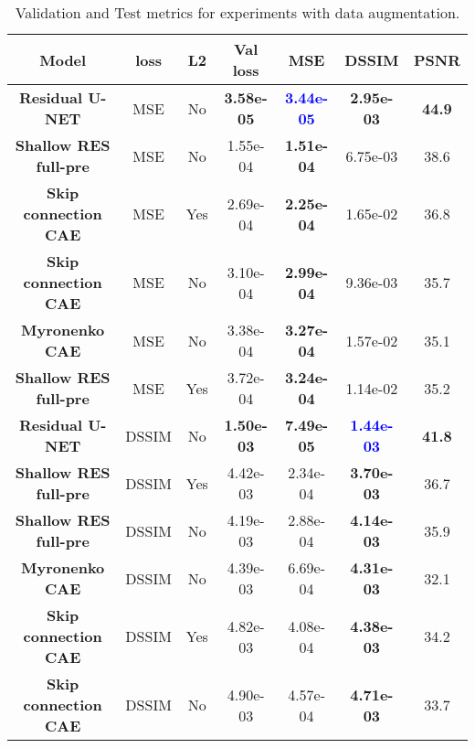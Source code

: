 \begin{table}[!ht]
  \begin{center}
   \setlength\extrarowheight{2pt} %
   \begin{tabular}{>{\bf}c c c | c | c c c}
    \toprule
    Model & \textbf{loss}  & \textbf{L2}  & \textbf{Val loss}  & \textbf{MSE}   & \textbf{DSSIM} & \textbf{PSNR} \\
    \hline   
    Residual U-NET        & MSE & No  & \textbf{3.58e-05}  & \textbf{\textcolor{blue}{3.44e-05}}   & \textbf{2.95e-03}	& \textbf{44.9}\\
    Shallow RES full-pre  & MSE & No  & 1.55e-04           & \textbf{1.51e-04}	                    & 6.75e-03	            & 38.6\\
    Skip connection CAE   & MSE & Yes & 2.69e-04           & \textbf{2.25e-04}	                    & 1.65e-02	            & 36.8\\
    Skip connection CAE   & MSE & No  & 3.10e-04           & \textbf{2.99e-04}	                    & 9.36e-03	            & 35.7\\
    Myronenko CAE         & MSE & No  & 3.38e-04           & \textbf{3.27e-04}	                    & 1.57e-02	            & 35.1\\
    Shallow RES full-pre  & MSE & Yes & 3.72e-04           & \textbf{3.24e-04}	                    & 1.14e-02	            & 35.2\\
    \hline 
    \hline 
    Residual U-NET        & DSSIM & No  & \textbf{1.50e-03}& \textbf{7.49e-05} & \textbf{\textcolor{blue}{1.44e-03}} & \textbf{41.8}  \\
    Shallow RES full-pre  & DSSIM & Yes &  4.42e-03        &  2.34e-04        & \textbf{3.70e-03}	                 & 36.7       \\
    Shallow RES full-pre  & DSSIM & No  &  4.19e-03        &  2.88e-04        & \textbf{4.14e-03}                     & 35.9       \\
    Myronenko CAE         & DSSIM & No  &  4.39e-03        &  6.69e-04        & \textbf{4.31e-03}                     & 32.1        \\
    Skip connection CAE   & DSSIM & Yes &  4.82e-03        &  4.08e-04        & \textbf{4.38e-03}                     & 34.2        \\
    Skip connection CAE   & DSSIM & No  &  4.90e-03        &  4.57e-04        & \textbf{4.71e-03}                     & 33.7        \\
    \bottomrule
    \end{tabular}
    \end{center}
    \caption{Validation and Test metrics for experiments with data augmentation.}
    \label{table:expaug}
\end{table}

